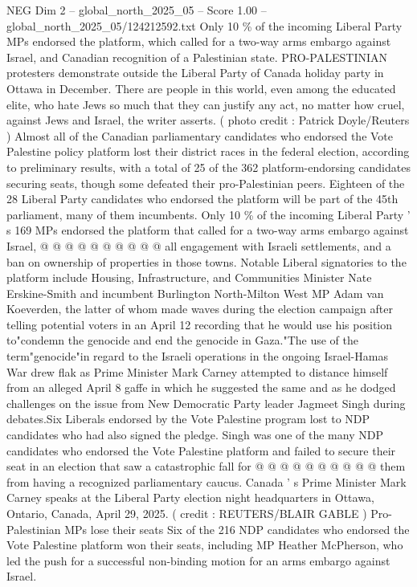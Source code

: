 \begin{textsample}{NEG Dim 2 – global\_north\_2025\_05 – Score 1.00 – global\_north\_2025\_05/124212592.txt}  \label{ex:f2_neg_037}
Only 10 \% of the incoming Liberal Party MPs endorsed the platform, which called for a two-way arms embargo against Israel, and Canadian recognition of a Palestinian state.
PRO-PALESTINIAN protesters demonstrate outside the Liberal Party of Canada holiday party in Ottawa in December.
There are people in this world, even among the educated elite, who hate Jews so much that they can justify any act, no matter how cruel, against Jews and Israel, the writer asserts. ( photo credit : Patrick Doyle/Reuters ) Almost all of the Canadian parliamentary candidates who endorsed the Vote Palestine policy platform lost their district races in the federal election, according to preliminary results, with a total of 25 of the 362 platform-endorsing candidates securing seats, though some defeated their pro-Palestinian peers.
Eighteen of the 28 Liberal Party candidates who endorsed the platform will be part of the 45th parliament, many of them incumbents.
Only 10 \% of the incoming Liberal Party ' s 169 MPs endorsed the platform that called for a two-way arms embargo against Israel, @ @ @ @ @ @ @ @ @ @ all engagement with Israeli settlements, and a ban on ownership of properties in those towns.
Notable Liberal signatories to the platform include Housing, Infrastructure, and Communities Minister Nate Erskine-Smith and incumbent Burlington North-Milton West MP Adam van Koeverden, the latter of whom made waves during the election campaign after telling potential voters in an April 12 recording that he would use his position to"condemn the genocide and end the genocide in Gaza."The use of the term"genocide"in regard to the Israeli operations in the ongoing Israel-Hamas War drew flak as Prime Minister Mark Carney attempted to distance himself from an alleged April 8 gaffe in which he suggested the same and as he dodged challenges on the issue from New Democratic Party leader Jagmeet Singh during debates.Six Liberals endorsed by the Vote Palestine program lost to NDP candidates who had also signed the pledge.
Singh was one of the many NDP candidates who endorsed the Vote Palestine platform and failed to secure their seat in an election that saw a catastrophic fall for @ @ @ @ @ @ @ @ @ @ them from having a recognized parliamentary caucus.
Canada ' s Prime Minister Mark Carney speaks at the Liberal Party election night headquarters in Ottawa, Ontario, Canada, April 29, 2025. ( credit : REUTERS/BLAIR GABLE ) Pro-Palestinian MPs lose their seats Six of the 216 NDP candidates who endorsed the Vote Palestine platform won their seats, including MP Heather McPherson, who led the push for a successful non-binding motion for an arms embargo against Israel.

\end{textsample}
